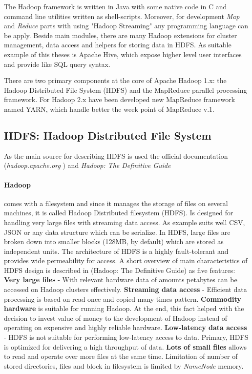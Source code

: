 \documentclass[a4paper,12pt,oneside]{report}
\begin{document}
The Hadoop framework is written in Java with some native code in C and command line utilities written 
as shell-scripts. Moreover, for development \textit{Map} and \textit{Reduce} parts  
with using "Hadoop Streaming" any programming language can be apply. 
Beside main modules, there are many Hadoop extensions for cluster management, 
data access and helpers for storing data in HDFS. As suitable example of this theses is Apache Hive, 
which expose higher level user interfaces and provide like SQL query syntax. 

There are two primary components at the core of Apache Hadoop 1.x: the Hadoop Distributed File System 
(HDFS) and the MapReduce parallel processing framework. For Hadoop 2.x have been developed new MapReduce 
framework named YARN, which handle better the week point of MapReduce v.1.


		\subsection{HDFS: Hadoop Distributed File System}\label{subsec:hdfs}
As the main source for describing HDFS is used the official documentation (\textit{hadoop.apache.org} 
\cite{hadoop_web}) and  \textit{Hadoop: The Definitive Guide}\cite{hadoop_definitive}

\paragraph*{Hadoop} comes with a filesystem and since it manages the storage of files on several 
machines, it is called Hadoop Distributed filesystem (HDFS). Is designed for handling very large files with streaming
data access. As example suits well CSV, JSON or any data structure which can be serialize. \cite{hadoop_hdfs_web} In HDFS, large files are broken down into smaller blocks (128MB, by default) which are 
stored as independent units. The architecture of HDFS is a highly fault-tolerant and provides wide permeability
for access.   
  A short overview of main characteristics of HDFS design is described in (Hadoop: The Definitive 
  Guide\cite{hadoop_definitive}) as five features: \textbf{Very large files} - With relevant hardware data of amounts petabytes 
can be accessed on Hadoop clusters effectively. \textbf{Streaming data access} - Efficient data processing is based on
 read once and copied many times pattern. \textbf{Commodity hardware} is suitable for running Hadoop. At the end,
 this fact helped with the decision to invest value of money to the development of Hadoop instead 
 of operating on expensive and highly reliable hardware. \textbf{Low-latency data access} - HDFS is not suitable for performing
 low-latency access to data. Primary, HDFS is optimized for delivering
a high throughput of data. \textbf{Lots of small files} allows to read and operate over more files
 at the same time. Limitation of number of stored directories,  files and block in filesystem is limited by \emph{NameNode} memory.
\end{document}
